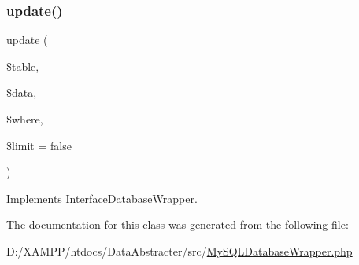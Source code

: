 \subsubsection{\texorpdfstring{update()}{update()}}
{\footnotesize\ttfamily update (\begin{DoxyParamCaption}\item[{}]{\$table,  }\item[{}]{\$data,  }\item[{}]{\$where,  }\item[{}]{\$limit = {\ttfamily false} }\end{DoxyParamCaption})}



Implements \hyperlink{interface_david_fricker_1_1_data_abstracter_1_1_interface_database_wrapper_a01031130a0d4895f40ffe781941c7d9d}{Interface\+Database\+Wrapper}.



The documentation for this class was generated from the following file\+:\begin{DoxyCompactItemize}
\item 
D\+:/\+X\+A\+M\+P\+P/htdocs/\+Data\+Abstracter/src/\hyperlink{_my_s_q_l_database_wrapper_8php}{My\+S\+Q\+L\+Database\+Wrapper.\+php}\end{DoxyCompactItemize}
